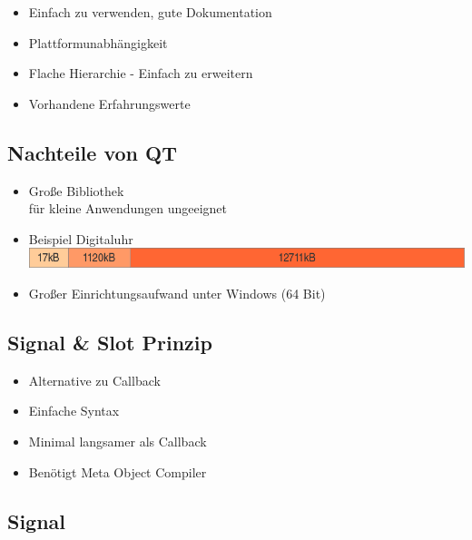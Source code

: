 \begin{frame}{\insertsubsection}
    \begin{itemize}
         \item Einfach zu verwenden, gute Dokumentation
         \item Plattformunabhängigkeit
         \item Flache Hierarchie - Einfach zu erweitern
         \item Vorhandene Erfahrungswerte
    \end{itemize}
\end{frame}

\subsection{Nachteile von QT}

\begin{frame}{\insertsubsection}
    \begin{itemize}
         \item Große Bibliothek\\
         für kleine Anwendungen ungeeignet
         \item Beispiel Digitaluhr\\
         \includegraphics[scale=0.2]{g3}
         \item Großer Einrichtungsaufwand unter Windows (64 Bit)
    \end{itemize}
\end{frame}

\subsection{Signal \& Slot Prinzip}

\begin{frame}{\insertsubsection}
    \begin{itemize}
         \item Alternative zu Callback
         \item Einfache Syntax
         \item Minimal langsamer als Callback
         \item Benötigt Meta Object Compiler
    \end{itemize}
\end{frame}

\subsection{Signal}

